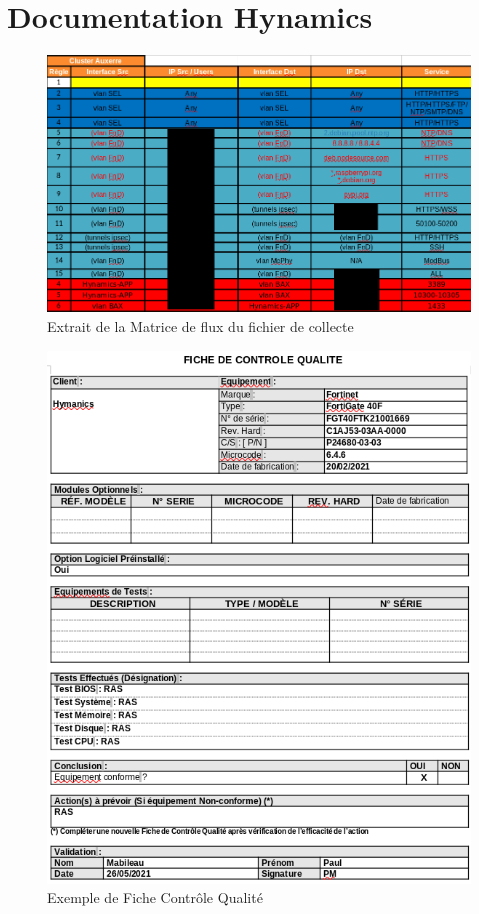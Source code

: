 \documentclass[12pt, oneside, a4paper, titlepage]{report}
\begin{document}
\section{Documentation Hynamics}%
\label{sec:annexes::doc-hy}

\begin{figure}[h!]
    \centering
    \includegraphics[width = \linewidth]{img/doc-hy/collect.png}
    \caption{Extrait de la Matrice de flux du fichier de collecte}%
    \label{fig:doc-hy/collect}
\end{figure}

\begin{figure}[h!]
    \centering
    \includegraphics[width = \linewidth]{img/doc-hy/fcq.png}
    \caption{Exemple de Fiche Contrôle Qualité}%
    \label{fig:doc-hy/fcq}
\end{figure}
\end{document}
